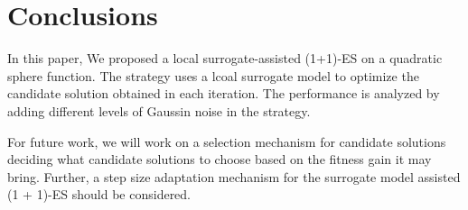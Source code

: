 \section{Conclusions}
In this paper, We proposed a local surrogate-assisted (1+1)-ES on a quadratic sphere function. The strategy uses a lcoal surrogate model to optimize the candidate solution obtained in each iteration. The performance is analyzed by adding different levels of Gaussin noise in the strategy. 

For future work, we will work on a selection mechanism for candidate solutions deciding what candidate solutions to choose based on the fitness gain it may bring. Further, a step size adaptation mechanism for the surrogate model assisted (1 + 1)-ES should be considered. 






